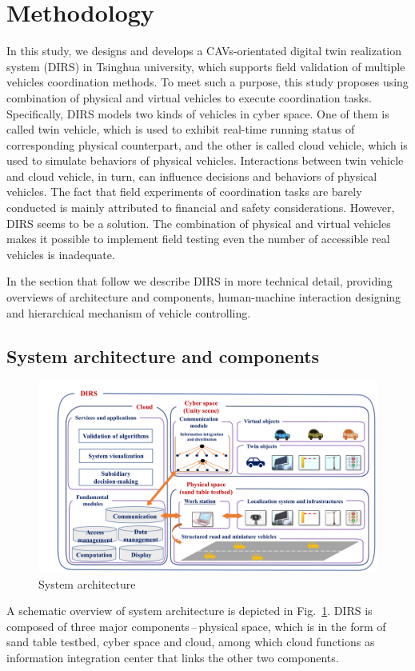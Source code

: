 \documentclass[conference]{IEEEtran}
\begin{document}
\section{Methodology}
\label{sec:methodology}
	In this study, we designs and develops a CAVs-orientated digital twin realization system (DIRS) in Tsinghua university, which supports field validation of multiple vehicles coordination methods. To meet such a purpose, this study proposes using combination of physical and virtual vehicles to execute coordination tasks. Specifically, DIRS models two kinds of vehicles in cyber space. One of them is called twin vehicle, which is used to exhibit real-time running status of corresponding physical counterpart, and the other is called cloud vehicle, which is used to simulate behaviors of physical vehicles. Interactions between twin vehicle and cloud vehicle, in turn, can influence decisions and behaviors of physical vehicles. The fact that field experiments of coordination tasks are barely conducted is mainly attributed to financial and safety considerations. However, DIRS seems to be a solution. The combination of physical and virtual vehicles makes it possible to implement field testing even the number of accessible real vehicles is inadequate.
	
	In the section that follow we describe DIRS in more technical detail, providing overviews of architecture and components, human-machine interaction designing and hierarchical mechanism of vehicle controlling.
\subsection{System architecture and components}
	\begin{figure}[htbp]
		\centering
		\includegraphics[width=.48\textwidth]{figure/systemArchitecture.png}
		\caption{System architecture}
		\label{fig:systemArchitecture}
	\end{figure}
	A schematic overview of system architecture is depicted in Fig.~\ref{fig:systemArchitecture}. DIRS is composed of three major components\,--\,physical space, which is in the form of sand table testbed, cyber space and cloud, among which cloud functions as information integration center that links the other two components.
\end{document}

